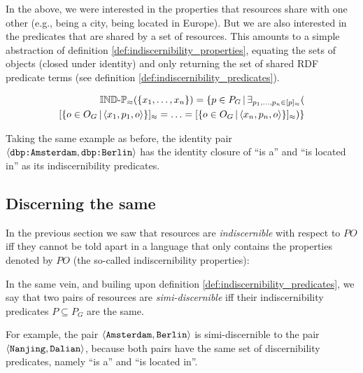 \noindent In the above, we were interested in the properties
  that resources share with one other
  (e.g., being a city, being located in Europe).
But we are also interested in the predicates that are shared by
  a set of resources.
This amounts to a simple abstraction of
  definition \ref{def:indiscernibility_properties},
  equating the sets of objects (closed under identity)
  and only returning the set of shared RDF predicate terms
  (see definition \ref{def:indiscernibility_predicates}).

\small
\begin{definition}
\label{def:indiscernibility_predicates}
\begin{align}
  \indp_{\approx}(\setrange{x_1}{x_n})
=
  \setdef{
    p \in P_G
  }{
    \exists_{\range{p_1}{p_n} \in \equivset{p}}(\nonumber\\
        \equivset{
          \setdef{
            o \in O_G
          }{
            \triple{x_1}{p_1}{o}
          }
        }
      =
        \ldots
      =
        \equivset{
          \setdef{
            o \in O_G
          }{
            \triple{x_n}{p_n}{o}
          }
        }
    )
  }\nonumber
\end{align}
\end{definition}
\normalsize

\noindent Taking the same example as before, the identity pair
  {\small $\langle\texttt{dbp:Amsterdam},\texttt{dbp:Berlin}\rangle$}
  has the identity closure of ``is a'' and ``is located in''
  as its indiscernibility predicates.



\subsection{Discerning the same}

In the previous section we saw that resources are \mbox{\emph{indiscernible}}
  with respect to $PO$ iff they cannot be told apart
  in a language that only contains the properties denoted by $PO$
  (the so-called indiscernibility properties):

In the same vein,
  and builing upon definition \ref{def:indiscernibility_predicates},
  we say that two pairs of resources are \emph{simi-discernible}
  iff their \mbox{indiscernibility} predicates $P \subseteq P_G$ are the same.

For example, the pair {\small $\langle\texttt{Amsterdam},\texttt{Berlin}\rangle$}
  is simi-discernible to the pair
  {\small $\langle\texttt{Nanjing},\texttt{Dalian}\rangle$},
  because both pairs have the same set of discernibility predicates,
  namely ``is a'' and ``is located in''.


